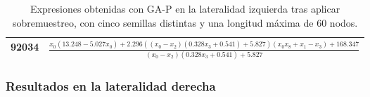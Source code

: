\begin{table}[H]
{\begin{tabular}{|c|c|}
92034            & $\frac{x_{0} \left(13.248 - 5.027 x_{0}\right) + 2.296 \left(\left(x_{0} - x_{2}\right) \left(0.328 x_{3} + 0.541\right) + 5.827\right) \left(x_{0} x_{8} + x_{1} - x_{3}\right) + 168.347}{\left(x_{0} - x_{2}\right) \left(0.328 x_{3} + 0.541\right) + 5.827}$                                                                              \\ \hline
\end{tabular}%
}
\caption{Expresiones obtenidas con GA-P en la lateralidad izquierda tras aplicar sobremuestreo, con cinco semillas distintas y una longitud máxima de 60 nodos.}\label{table:exp_GAP_over_l0_60}
\end{table}





\subsubsection{Resultados en la lateralidad derecha}


\begin{table}[H]
\centering
{}
\caption{Resultados de GA-P en la lateralidad derecha tras aplicar sobremuestreo, con cinco semillas distintas y una longitud máxima de 20 nodos.}\label{table:resultados_GAP_over_l1_20}
\end{table}



